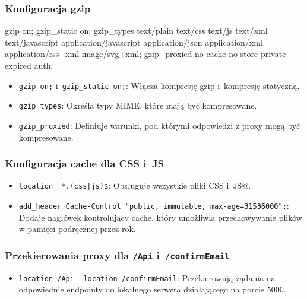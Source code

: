 \subsubsection{Konfiguracja gzip}
\begin{longlisting}[language=nginx,label={lst:n3}]
  gzip on;
  gzip_static on;
  gzip_types
    text/plain
    text/css
    text/js
    text/xml
    text/javascript
    application/javascript
    application/json
    application/xml
    application/rss+xml
    image/svg+xml;
  gzip_proxied no-cache no-store private expired auth;
\end{longlisting}
\begin{itemize}
    \item \texttt{gzip on;} i~\texttt{gzip\_static on;}: Włącza kompresję gzip i~kompresję statyczną.
    \item \texttt{gzip\_types}: Określa typy MIME, które mają być kompresowane.
    \item \texttt{gzip\_proxied}: Definiuje warunki, pod którymi odpowiedzi z proxy mogą być kompresowane.
\end{itemize}

\subsubsection{Konfiguracja cache dla CSS i~JS}
\begin{itemize}
    \item \texttt{location ~*.(css|js)\$}: Obsługuje wszystkie pliki CSS i~JS@.
    \item \texttt{add\_header Cache-Control "public, immutable, max-age=31536000";}: Dodaje nagłówek kontrolujący cache, który umożliwia przechowywanie plików w pamięci podręcznej przez rok.
\end{itemize}

\subsubsection{Przekierowania proxy dla \texttt{/Api} i~\texttt{/confirmEmail}}
\begin{itemize}
    \item \texttt{location /Api} i~\texttt{location /confirmEmail}: Przekierowują żądania na odpowiednie endpointy do lokalnego serwera działającego na porcie 5000.
\end{itemize}

